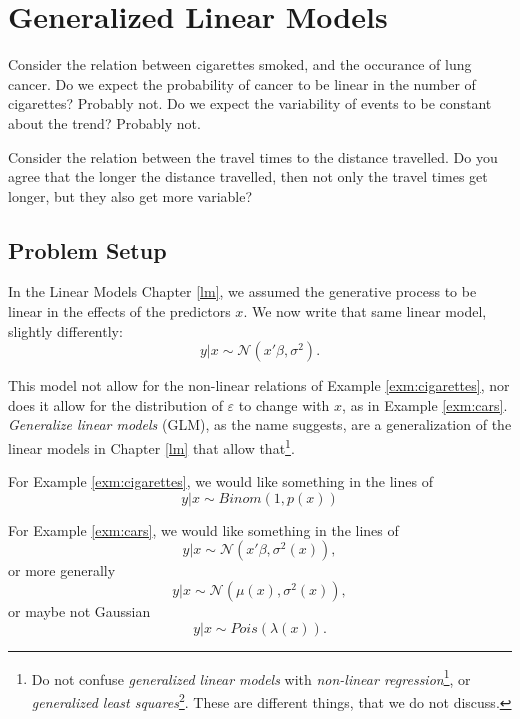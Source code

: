 \documentclass[]{book}
\renewcommand{\href}[2]{#2\footnote{\url{#1}}}
\theoremstyle{definition}
\theoremstyle{definition}
\theoremstyle{definition}
\theoremstyle{remark}
\let\BeginKnitrBlock\begin \let\EndKnitrBlock\end
\begin{document}
\hypertarget{glm}{%
\chapter{Generalized Linear Models}\label{glm}}

\BeginKnitrBlock{example}
\protect\hypertarget{exm:cigarettes}{}{\label{exm:cigarettes} }Consider the relation between cigarettes smoked, and the occurance of lung cancer.
Do we expect the probability of cancer to be linear in the number of cigarettes? Probably not.
Do we expect the variability of events to be constant about the trend? Probably not.
\EndKnitrBlock{example}

\BeginKnitrBlock{example}
\protect\hypertarget{exm:cars}{}{\label{exm:cars} }Consider the relation between the travel times to the distance travelled.
Do you agree that the longer the distance travelled, then not only the travel times get longer, but they also get more variable?
\EndKnitrBlock{example}

\hypertarget{problem-setup-1}{%
\section{Problem Setup}\label{problem-setup-1}}

In the Linear Models Chapter \ref{lm}, we assumed the generative process to be linear in the effects of the predictors \(x\).
We now write that same linear model, slightly differently:
\[
 y|x \sim \mathcal{N}(x'\beta, \sigma^2).
\]

This model not allow for the non-linear relations of Example \ref{exm:cigarettes}, nor does it allow for the distribution of \(\varepsilon\) to change with \(x\), as in Example \ref{exm:cars}.
\emph{Generalize linear models} (GLM), as the name suggests, are a generalization of the linear models in Chapter \ref{lm} that allow that\footnote{Do not confuse \emph{generalized linear models} with \href{https://en.wikipedia.org/wiki/Nonlinear_regression}{\emph{non-linear regression}}, or \href{https://en.wikipedia.org/wiki/Generalized_least_squares}{\emph{generalized least squares}}.
  These are different things, that we do not discuss.}.

For Example \ref{exm:cigarettes}, we would like something in the lines of
\[
 y|x \sim Binom(1,p(x))
\]

For Example \ref{exm:cars}, we would like something in the lines of
\[
 y|x \sim \mathcal{N}(x'\beta,\sigma^2(x)),
\]
or more generally
\[
 y|x \sim \mathcal{N}(\mu(x),\sigma^2(x)),
\]
or maybe not Gaussian
\[
 y|x \sim Pois(\lambda(x)).
\]
\end{document}
